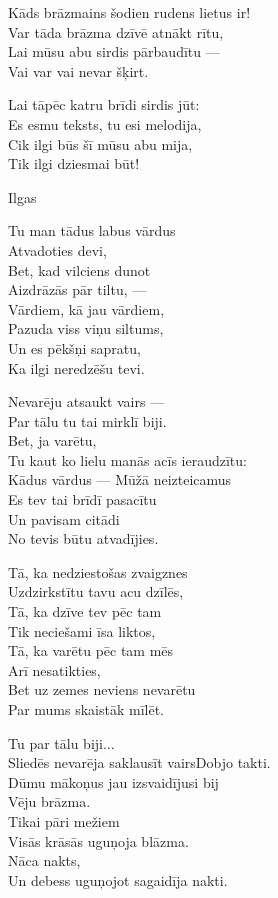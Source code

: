 \documentclass[14pt]{extarticle}
\begin{document}
{{Kāds brāzmains šodien rudens lietus ir!\\
Var tāda brāzma dzīvē atnākt rītu,\\
Lai mūsu abu sirdis pārbaudītu ---\\
Vai var vai nevar šķirt.

Lai tāpēc katru brīdi sirdis jūt:\\
Es esmu teksts, tu esi melodija,\\
Cik ilgi būs šī mūsu abu mija,\\
Tik ilgi dziesmai būt!


\newpage

{\large \sc Ilgas}

Tu man tādus labus vārdus\\
Atvadoties devi,\\
Bet, kad vilciens dunot\\
Aizdrāzās pār tiltu, ---\\
Vārdiem, kā jau vārdiem,\\
Pazuda viss viņu siltums,\\
Un es pēkšņi sapratu,\\
Ka ilgi neredzēšu tevi. 

Nevarēju atsaukt vairs ---\\
Par tālu tu tai mirklī biji.\\
Bet, ja varētu,\\
Tu kaut ko lielu manās acīs ieraudzītu:\\
Kādus vārdus --- Mūžā neizteicamus\\
Es tev tai brīdī pasacītu\\
Un pavisam citādi\\
No tevis būtu atvadījies.

Tā, ka nedziestošas zvaigznes\\
Uzdzirkstītu tavu acu dzīlēs,\\
Tā, ka dzīve tev pēc tam\\
Tik neciešami īsa liktos,\\
Tā, ka varētu pēc tam mēs\\
Arī nesatikties,\\
Bet uz zemes neviens nevarētu\\
Par mums skaistāk mīlēt.

Tu par tālu biji...\\
Sliedēs nevarēja saklausīt vairsDobjo takti.\\
Dūmu mākoņus jau izsvaidījusi bij\\
Vēju brāzma.\\
Tikai pāri mežiem\\
Visās krāsās uguņoja blāzma.\\
Nāca nakts,\\
Un debess uguņojot sagaidīja nakti.

}}
\end{document}
